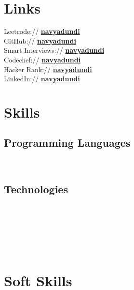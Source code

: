 \documentclass[]{deedy-resume-openfont}
\begin{document}
\begin{minipage}[t]{0.33\textwidth}
\section{Links} 
Leetcode://
\href{https://leetcode.com/navyadundi/}{\bf navyadundi}\\
GitHub://
\href{https://github.com/navyadundi}{\bf navyadundi}\\
Smart Interviews:// \href{https://smartinterviews.in/profile/navyadundi}{\bf navyadundi} \\
Codechef://  \href{https://www.codechef.com/users/navyadundi}{\bf navyadundi} \\
Hacker Rank://
\href{https://www.hackerrank.com/profile/navyadundi}{\bf navyadundi}\\
LinkedIn://  \href{https://www.linkedin.com/in/navyadundi/}{\bf navyadundi} \\

\sectionsep

\section{Skills}

\sectionsep
\subsection{Programming Languages}

 \\


 \subsection{Technologies}
\\
\\
\\
\\
\\



\section{Soft Skills}

\\
\\



\end{minipage}
\end{document}
